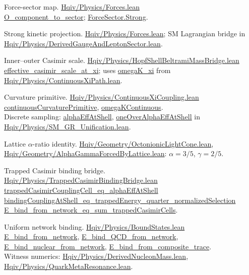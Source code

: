 \documentclass[11pt]{amsart}
\newcommand{\leanrepo}{https://github.com/HQIV/hqiv-lean/blob/main}
\newcommand{\leanfile}[1]{\href{\leanrepo/#1}{\footnotesize\url{#1}}}
\newcommand{\leanid}[1]{{\footnotesize\ttfamily\url{#1}}}
\newenvironment{leanindex}{%
  \begin{description}[style=nextline,leftmargin=0pt,labelindent=0pt,
    labelsep=0.5em,itemsep=0.75\baselineskip]%
  \footnotesize\raggedright\sloppy
}{%
  \end{description}%
}
\begin{document}
\begin{leanindex}

\item[\phantomsection\label{lean:force-sector}Force-sector map.]
  \leanfile{Hqiv/Physics/Forces.lean}\\
  \leanid{O_component_to_sector}; \leanid{ForceSector.Strong}.

\item[\phantomsection\label{lean:strong-kinetic}Strong kinetic projection.]
  \leanfile{Hqiv/Physics/Forces.lean};
  SM Lagrangian bridge in \leanfile{Hqiv/Physics/DerivedGaugeAndLeptonSector.lean}.

\item[\phantomsection\label{lean:inner-outer-casimir}Inner--outer Casimir scale.]
  \leanfile{Hqiv/Physics/HopfShellBeltramiMassBridge.lean}\\
  \leanid{effective_casimir_scale_at_xi};
  uses \leanid{omegaK_xi} from \leanfile{Hqiv/Physics/ContinuousXiPath.lean}.

\item[\phantomsection\label{lean:curvature-primitive}Curvature primitive.]
  \leanfile{Hqiv/Physics/ContinuousXiCoupling.lean}\\
  \leanid{continuousCurvaturePrimitive}, \leanid{omegaKContinuous}.\\
  Discrete sampling: \leanid{alphaEffAtShell}, \leanid{oneOverAlphaEffAtShell} in
  \leanfile{Hqiv/Physics/SM_GR_Unification.lean}.

\item[\phantomsection\label{lean:alpha-gamma}Lattice $\alpha$-ratio identity.]
  \leanfile{Hqiv/Geometry/OctonionicLightCone.lean},
  \leanfile{Hqiv/Geometry/AlphaGammaForcedByLattice.lean}:
  $\alpha=3/5$, $\gamma=2/5$.

\item[\phantomsection\label{lean:trapped-casimir-bridge}Trapped Casimir binding bridge.]
  \leanfile{Hqiv/Physics/TrappedCasimirBindingBridge.lean}\\
  \leanid{trappedCasimirCouplingCell_eq_alphaEffAtShell}\\
  \leanid{bindingCouplingAtShell_eq_trappedEnergy_quarter_normalizedSelection}\\
  \leanid{E_bind_from_network_eq_sum_trappedCasimirCells}.

\item[\phantomsection\label{lean:binding-network}Uniform network binding.]
  \leanfile{Hqiv/Physics/BoundStates.lean}\\
  \leanid{E_bind_from_network}, \leanid{E_bind_QCD_from_network},
  \leanid{E_bind_nuclear_from_network}, \leanid{E_bind_from_composite_trace}.\\
  Witness numerics: \leanfile{Hqiv/Physics/DerivedNucleonMass.lean},
  \leanfile{Hqiv/Physics/QuarkMetaResonance.lean}.


\end{leanindex}
\end{document}
